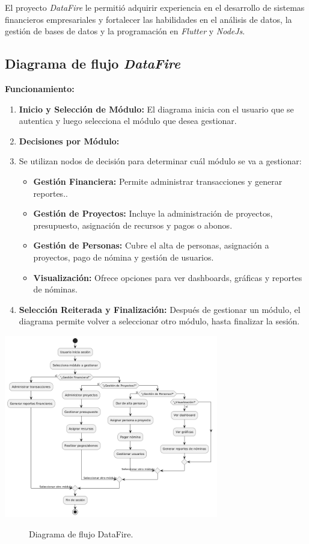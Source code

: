 \documentclass[protocolo.tex]{subfiles}
\begin{document}
El proyecto \textit{DataFire} le permitió adquirir experiencia en el desarrollo de sistemas financieros empresariales y fortalecer las habilidades en el análisis de datos, la gestión de bases de datos y la programación en \textit{Flutter} y \textit{NodeJs}.

\subsection{Diagrama de flujo \textit{DataFire} }
\textbf{Funcionamiento:}
\begin{enumerate}
    \item \textbf{Inicio y Selección de Módulo:}  
    El diagrama inicia con el usuario que se autentica y luego selecciona el módulo que desea gestionar.
    \item \textbf{Decisiones por Módulo:} 
    \item Se utilizan nodos de decisión para determinar cuál módulo se va a gestionar:
        \begin{itemize}
            \item \textbf{Gestión Financiera:}  Permite administrar transacciones y generar reportes..
            \item \textbf{Gestión de Proyectos:}  Incluye la administración de proyectos, presupuesto, asignación de recursos y pagos o abonos.
            \item \textbf{Gestión de Personas:}  Cubre el alta de personas, asignación a proyectos, pago de nómina y gestión de usuarios.
            \item \textbf{Visualización:} Ofrece opciones para ver dashboards, gráficas y reportes de nóminas.
        \end{itemize}
    \item \textbf{Selección Reiterada y Finalización:} 
    Después de gestionar un módulo, el diagrama permite volver a seleccionar otro módulo, hasta finalizar la sesión.
\end{enumerate}

\begin{center}
\includegraphics[width=0.7\textwidth]{Imagenes/datafire.png}
\end{center}
\begin{figure}[h]  %
    \centering
    \caption{Diagrama de flujo DataFire.}
    \label{fig:mi-figura}
\end{figure}
\end{document}
